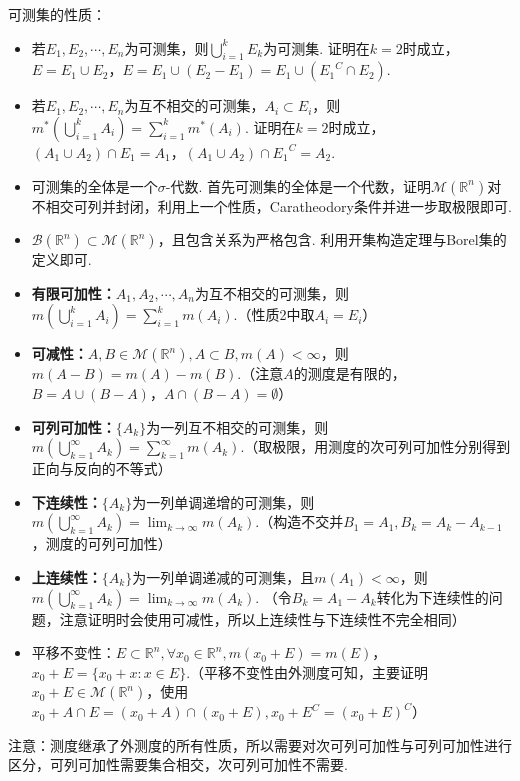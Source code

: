 \documentclass[bwprint, withoutpreface]{cumcmthesis}
\begin{document}
可测集的性质：
\begin{itemize}[itemindent=2em]
	\item 若$E_1, E_2, \cdots, E_n$为可测集，则$\bigcup_{i = 1}^{k}{E_k}$为可测集.
	证明在$k = 2$时成立，$E = E_1 \cup E_2$，$E = E_1 \cup (E_2 - E_1) = E_1 \cup ({E_1}^C \cap E_2)$.
	\item 若$E_1, E_2, \cdots, E_n$为互不相交的可测集，$A_i \subset E_i$，则$m^*(\bigcup_{i = 1}^{k}{A_i}) = \sum_{i = 1}^{k}{m^*(A_i)}$.
	证明在$k = 2$时成立，$(A_1 \cup A_2) \cap E_1 = A_1$，$(A_1 \cup A_2) \cap {E_1}^C = A_2$.
	\item 可测集的全体是一个$\sigma$-代数.
	首先可测集的全体是一个代数，证明$\mathcal{M}(\mathbb{R}^n)$对不相交可列并封闭，利用上一个性质，Caratheodory条件并进一步取极限即可.
	\item $\mathcal{B}(\mathbb{R}^n) \subset \mathcal{M}(\mathbb{R}^n)$，且包含关系为严格包含.
	利用开集构造定理与Borel集的定义即可.
	\item \textbf{有限可加性：}$A_1, A_2, \cdots, A_n$为互不相交的可测集，则$m(\bigcup_{i = 1}^{k}{A_i}) = \sum_{i = 1}^{k}{m(A_i)}$.（性质2中取$A_i = E_i$）
	\item \textbf{可减性：}$A, B \in \mathcal{M}(\mathbb{R}^n), A \subset B, m(A) < \infty$，则$m(A - B) = m(A) - m(B).$（注意$A$的测度是有限的，$B = A \cup (B - A)$，$A \cap (B - A) = \emptyset$）
	\item \textbf{可列可加性：}$\{A_k\}$为一列互不相交的可测集，则$m(\bigcup_{k = 1}^{\infty}{A_k}) = \sum_{k = 1}^{\infty}{m(A_k)}$.（取极限，用测度的次可列可加性分别得到正向与反向的不等式）
	\item \textbf{下连续性：}$\{A_k\}$为一列单调递增的可测集，则$m(\bigcup_{k = 1}^{\infty}{A_k}) = \lim_{k \to \infty} m(A_k)$.（构造不交并$B_1 = A_1, B_k = A_k - A_{k - 1}$，测度的可列可加性）
	\item \textbf{上连续性：}$\{A_k\}$为一列单调递减的可测集，且$m(A_1) < \infty$，则$m(\bigcup_{k = 1}^{\infty}{A_k}) = \lim_{k \to \infty} m(A_k)$. （令$B_k = A_1 - A_k$转化为下连续性的问题，注意证明时会使用可减性，所以上连续性与下连续性不完全相同）
	\item 平移不变性：$E \subset \mathbb{R}^n, \forall x_0 \in \mathbb{R}^n, m(x_0 + E) = m(E)$，$x_0 + E = \{x_0 + x: x \in E\}$.（平移不变性由外测度可知，主要证明$x_0 + E \in \mathcal{M}(\mathbb{R}^n)$，使用$x_0 + A \cap E = (x_0 + A) \cap (x_0 + E), x_0 + E^C = (x_0 + E)^C$）
\end{itemize}

注意：测度继承了外测度的所有性质，所以需要对次可列可加性与可列可加性进行区分，可列可加性需要集合相交，次可列可加性不需要.
\end{document}

